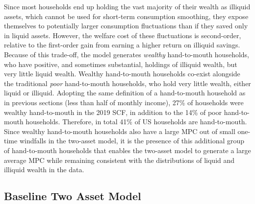 Since most households end up holding the vast majority of their wealth as illiquid assets, which cannot be  used for short-term consumption smoothing, they expose themselves to potentially larger consumption fluctuations than if they saved only in liquid assets. However, the welfare cost of these fluctuations is second-order, relative to the first-order gain from earning a higher return on illiquid savings. Because of this trade-off, the model generates \emph{wealthy} hand-to-mouth households, who have positive, and sometimes substantial, holdings of illiquid wealth, but very little liquid wealth. Wealthy hand-to-mouth households co-exist alongside the traditional \emph{poor} hand-to-mouth households, who hold very little wealth, either liquid or illiquid. Adopting the same definition of a hand-to-mouth household as in previous sections (less than half of monthly income), 27\% of households were wealthy hand-to-mouth in the 2019 SCF, in addition to the 14\% of poor hand-to-mouth households. Therefore, in total 41\% of US households are hand-to-mouth. Since wealthy hand-to-mouth households also have a large MPC out of small one-time windfalls in the two-asset model, it is the presence of this additional group of hand-to-mouth households that enables the two-asset model to generate a large average MPC while remaining consistent with the distributions of liquid and illiquid wealth in the data.


\subsection{Baseline Two Asset Model} \label{sec:two_asset_HP}

